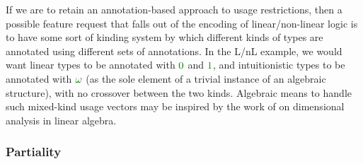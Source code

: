 If we are to retain an annotation-based approach to usage restrictions, then a
possible feature request that falls out of the encoding of linear/non-linear
logic is to have some sort of kinding system by which different kinds of types
are annotated using different sets of annotations.
In the L/nL example, we would want linear types to be annotated with $\gr0$ and
$\gr1$, and intuitionistic types to be annotated with $\gr\omega$ (as the sole
element of a trivial instance of an algebraic structure), with no crossover
between the two kinds.
Algebraic means to handle such mixed-kind usage vectors may be inspired by the
work of \citet{Hart95,MF21} on dimensional analysis in linear algebra.

\subsubsection{Partiality}\label{sec:part}

